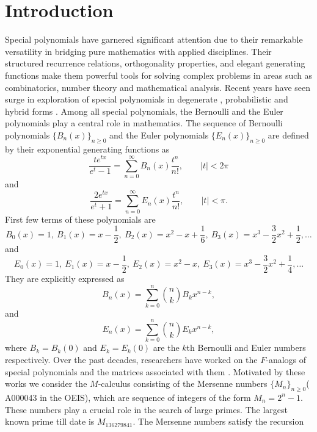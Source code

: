 \documentclass[12pt, a4paper]{article}
\begin{document}
\section{Introduction}
Special polynomials have garnered significant attention due to their remarkable versatility in bridging pure mathematics with applied disciplines. Their structured recurrence relations, orthogonality properties, and elegant generating functions make them powerful tools for solving complex problems in areas such as combinatorics, number theory and mathematical analysis. Recent years have seen surge in exploration of special polynomials in degenerate , probabilistic and hybrid forms \cite{KK1,KK2,KK3,KK4,RB,RC,RK,KK5,ZW}.
Among all special polynomials, the Bernoulli and the Euler polynomials play a central role in mathematics. The sequence of Bernoulli polynomials $\{B_n(x)\}_{n \geq 0}$ and the Euler polynomials $\{E_n(x)\}_{n \geq 0}$ \cite{AH} are defined by their exponential generating functions as
\begin{equation}
\frac{te^{tx}}{e^t-1} = \sum_{n=0}^{\infty} B_n(x) \frac{t^n}{n!}, \hspace{2em}|t| < 2\pi
\end{equation}
and
\begin{equation}
\frac{2e^{tx}}{e^t+1} = \sum_{n=0}^{\infty} E_n(x) \frac{t^n}{n!}, \hspace{2em}|t| < \pi.
\end{equation}
First few terms of these polynomials are 
\[B_0(x) = 1, ~B_1(x) = x-\frac{1}{2}, ~B_2(x) = x^2-x+\frac{1}{6}, ~ B_3(x) = x^3-\frac{3}{2}x^2+\frac{1}{2}, \dots\]
and
\[E_0(x) = 1, ~E_1(x) = x-\frac{1}{2}, ~E_2(x) = x^2-x, ~E_3(x) = x^3-\frac{3}{2}x^2+\frac{1}{4}, \dots\]
They are explicitly expressed as
\begin{equation*}
B_{n}(x) = \sum_{k=0}^{n}\binom{n}{k}B_{k}x^{n-k}, 
\end{equation*}
and 
\begin{equation*}
E_{n}(x) = \sum_{k=0}^{n}\binom{n}{k}E_{k}x^{n-k}, 
\end{equation*}
where $B_k = B_k(0)$ and $E_k = E_k(0)$ are the $k$th Bernoulli and Euler numbers respectively. 
Over the past decades, researchers have worked on  the $F$-analogs of special polynomials and the matrices associated with them \cite{DA,GT,MK,KTK,RUF,TKK,URW}.  Motivated by these works we consider the $M$-calculus consisting of the Mersenne numbers $\{M_n\}_{n\geq0}$( A000043 in the OEIS), which are sequence of integers of the form $M_n = 2^n-1.$ These numbers play a crucial role in the search of large primes. The largest known prime till date is $M_{136279841}.$ The Mersenne numbers satisfy the recursion
\end{document}
